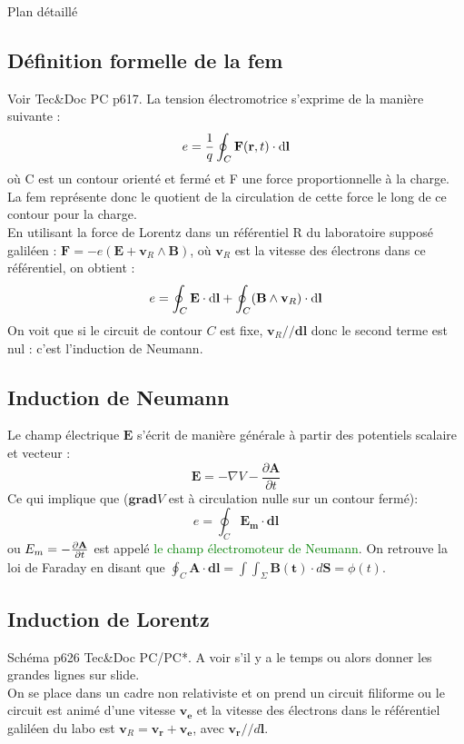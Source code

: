 \begin{reportBlock}{Plan détaillé}
\subsection{Définition formelle de la fem}
Voir Tec\&Doc PC p617. La tension électromotrice s'exprime de la manière suivante :
\begin{equation}
    e = \frac{1}{q} \oint_{C} \mathbf F(\mathbf r, t) \cdot \mathrm{d} \mathbf l
\end{equation}
où C est un contour orienté et fermé et F une force proportionnelle à la charge. La fem représente donc le quotient de la circulation de cette force le long de ce contour pour la charge.\\ 
En utilisant la force de Lorentz dans un référentiel R du laboratoire supposé galiléen : $\mathbf F = -e(\mathbf{E}+\mathbf{v}_R\wedge \mathbf{B})$, où $\mathbf{v}_R$ est la vitesse des électrons dans ce référentiel, on obtient : 
\begin{equation}
    e = \oint_{C} \mathbf E \cdot \mathrm{d} \mathbf l + \oint_C (\mathbf B \land \mathbf v_R) \cdot \mathrm{d} \mathbf l
\end{equation}
On voit que si le circuit de contour $C$ est fixe, $\mathbf{v}_R//\mathbf{dl}$ donc le second terme est nul : c'est l'induction de Neumann.

\subsection{Induction de Neumann}
Le champ électrique $\mathbf{E}$ s'écrit de manière générale à partir des potentiels scalaire et vecteur :
\begin{equation}
    \mathbf E = - \nabla V - \frac{\partial \mathbf A}{\partial t}
\end{equation}
Ce qui implique que ($\mathbf{grad}V$ est à circulation nulle sur un contour fermé):
\begin{equation}
    e = \oint_C \mathbf{E_m}\cdot \mathbf{dl}
\end{equation}
ou $E_m = -\frac{\partial \mathbf{A}}{\partial t}$ est appelé \textcolor{green}{le champ électromoteur de Neumann}. On retrouve la loi de Faraday en disant que $\oint_C \mathbf{A}\cdot\mathbf{dl}=\int\int_\Sigma \mathbf{B(t)}\cdot d\mathbf{S}=\phi(t)$.
 
 \subsection{Induction de Lorentz}
 Schéma p626 Tec\&Doc PC/PC*. A voir s'il y a le temps ou alors donner les grandes lignes sur slide.\\
 On se place dans un cadre non relativiste et on prend un circuit filiforme ou le circuit est animé d'une vitesse $\mathbf{v_e}$ et la vitesse des électrons dans le référentiel galiléen du labo est $\mathbf{v}_R= \mathbf{v_r} + \mathbf{v_e}$, avec $\mathbf{v_r} // d\mathbf{l}$. \\
 

\end{reportBlock}
